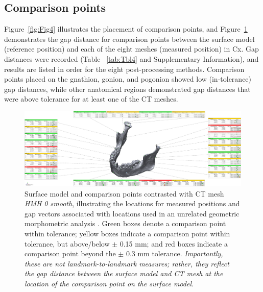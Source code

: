 \documentclass[review]{elsarticle}
\begin{document}
\subsection{Comparison points}
Figure~\ref{fig:Fig4} illustrates the placement of comparison points, and Figure~\ref{fig:Fig5} demonstrates the gap distance for comparison points between the surface model (reference position) and each of the eight meshes (measured position) in Cx. Gap distances were recorded (Table ~\ref{tab:Tbl4} and Supplementary Information), and results are listed in order for the eight post-processing methods. Comparison points placed on the gnathion, gonion, and pogonion showed low (in-tolerance) gap distances, while other anatomical regions demonstrated gap distances that were above tolerance for at least one of the CT meshes.

\begin{figure}[ht]\centering
\includegraphics[width=\linewidth]{Fig5}
\caption{Surface model and comparison points contrasted with CT mesh \textit{HMH 0 smooth}, illustrating the locations for measured positions and gap vectors associated with locations used in an unrelated geometric morphometric analysis \cite[Supplementary Information]{RN11477}. Green boxes denote a comparison point within tolerance; yellow boxes indicate a comparison point within tolerance, but above/below $\pm$ 0.15 mm; and red boxes indicate a comparison point beyond the $\pm$ 0.3 mm tolerance. \textit{Importantly, these are not landmark-to-landmark measures; rather, they reflect the gap distance between the surface model and CT mesh at the location of the comparison point on the surface model}.}
\label{fig:Fig5}
\end{figure}
\end{document}
